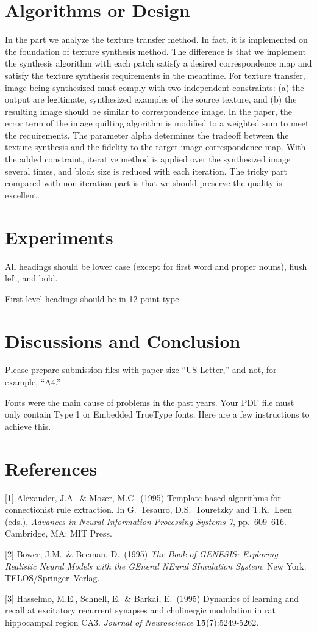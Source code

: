 \documentclass{article}
\begin{document}
\section{Algorithms or Design}
In the part we analyze the texture transfer method. In fact, it is implemented on the foundation of
texture synthesis method. The difference is that we implement the synthesis algorithm with each patch
satisfy a desired correspondence map and satisfy the texture synthesis requirements in the meantime.
For texture transfer, image being synthesized must comply with two independent constraints: (a)
the output are legitimate, synthesized examples of the source texture, and (b) the resulting image
should be similar to correspondence image. In the paper, the error term of the image quilting algorithm
is modified to a weighted sum to meet the requirements. The parameter alpha determines the tradeoff
between the texture synthesis and the fidelity to the target image correspondence map.
With the added constraint, iterative method is applied over the synthesized image several times,
and block size is reduced with each iteration. The tricky part compared with non-iteration part is that
we should preserve the quality is excellent. 

\section{Experiments}
\label{headings}


All headings should be lower case (except for first word and proper nouns),
flush left, and bold.


First-level headings should be in 12-point type.



\section{Discussions and Conclusion}


Please prepare submission files with paper size ``US Letter,'' and not, for
example, ``A4.''


Fonts were the main cause of problems in the past years. Your PDF file must only
contain Type 1 or Embedded TrueType fonts. Here are a few instructions to
achieve this.


\section*{References}

{
\small


[1] Alexander, J.A.\ \& Mozer, M.C.\ (1995) Template-based algorithms for
connectionist rule extraction. In G.\ Tesauro, D.S.\ Touretzky and T.K.\ Leen
(eds.), {\it Advances in Neural Information Processing Systems 7},
pp.\ 609--616. Cambridge, MA: MIT Press.


[2] Bower, J.M.\ \& Beeman, D.\ (1995) {\it The Book of GENESIS: Exploring
  Realistic Neural Models with the GEneral NEural SImulation System.}  New York:
TELOS/Springer--Verlag.


[3] Hasselmo, M.E., Schnell, E.\ \& Barkai, E.\ (1995) Dynamics of learning and
recall at excitatory recurrent synapses and cholinergic modulation in rat
hippocampal region CA3. {\it Journal of Neuroscience} {\bf 15}(7):5249-5262.
}
\end{document}
